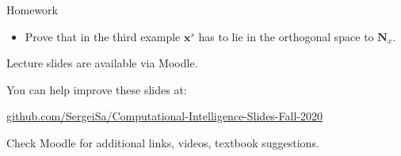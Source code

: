 \documentclass{beamer}
\begin{document}
\begin{frame}{Homework}
\begin{flushleft}

\begin{itemize}
    \item Prove that in the third example $\mathbf{x}^s$ has to lie in the orthogonal space to $\mathbf{N}_x$.
\end{itemize}

\end{flushleft}
\end{frame}




\begin{frame}
\centerline{Lecture slides are available via Moodle.}
\bigskip
\centerline{You can help improve these slides at:}

\centerline{\href{https://github.com/SergeiSa/Computational-Intelligence-Slides-Fall-2020}{github.com/SergeiSa/Computational-Intelligence-Slides-Fall-2020}}


\bigskip
\centerline{Check Moodle for additional links, videos, textbook suggestions.}
\end{frame}
\end{document}
